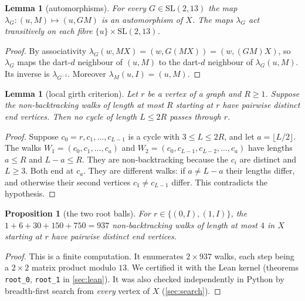 \documentclass[11pt]{article}
\numberwithin{equation}{section}
\newtheorem{proposition}[theorem]{Proposition}
\newtheorem{lemma}[theorem]{Lemma}
\theoremstyle{definition}
\theoremstyle{remark}
\newcommand{\SL}{\mathrm{SL}}
\begin{document}
\begin{lemma}[automorphisms]\label{lem:aut}
For every $G\in\SL(2,13)$ the map $\lambda_G\colon(u,M)\mapsto(u,GM)$ is an automorphism of $X$.
The maps $\lambda_G$ act transitively on each fibre $\{u\}\times\SL(2,13)$.
\end{lemma}
\begin{proof}
By associativity $\lambda_G(w,MX)=(w,G(MX))=(w,(GM)X)$, so $\lambda_G$ maps the dart-$d$ neighbour
of $(u,M)$ to the dart-$d$ neighbour of $\lambda_G(u,M)$. Its inverse is $\lambda_{G^{-1}}$.
Moreover $\lambda_{M}(u,I)=(u,M)$.
\end{proof}

\begin{lemma}[local girth criterion]\label{lem:local}
Let $r$ be a vertex of a graph and $R\ge1$. Suppose the non-backtracking walks of length at most
$R$ starting at $r$ have pairwise distinct end vertices. Then no cycle of length $L\le 2R$
passes through $r$.
\end{lemma}
\begin{proof}
Suppose $c_0=r,c_1,\dots,c_{L-1}$ is a cycle with $3\le L\le 2R$, and let $a=\lfloor L/2\rfloor$.
The walks $W_1=(c_0,c_1,\dots,c_a)$ and $W_2=(c_0,c_{L-1},c_{L-2},\dots,c_a)$ have lengths
$a\le R$ and $L-a\le R$. They are non-backtracking because the $c_i$ are distinct and $L\ge3$.
Both end at $c_a$. They are different walks: if $a\ne L-a$ their lengths differ, and otherwise
their second vertices $c_1\ne c_{L-1}$ differ. This contradicts the hypothesis.
\end{proof}

\begin{proposition}[the two root balls]\label{prop:balls}
For $r\in\{(0,I),(1,I)\}$, the $1+6+30+150+750=937$ non-backtracking walks of length at most $4$
in $X$ starting at $r$ have pairwise distinct end vertices.
\end{proposition}
\begin{proof}
This is a finite computation. It enumerates $2\times 937$ walks, each step being a $2\times2$
matrix product modulo $13$. We certified it with the Lean kernel (theorems \texttt{root\_0},
\texttt{root\_1} in \cref{sec:lean}). It was also checked independently in Python by
breadth-first search from \emph{every} vertex of $X$ (\cref{sec:search}).
\end{proof}
\end{document}
